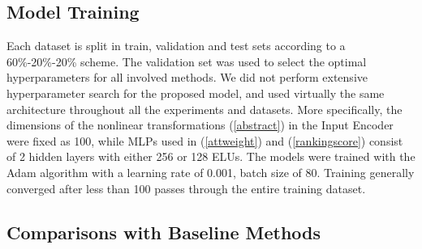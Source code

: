 \documentclass[letterpaper]{article} %
\begin{document}
\subsection{Model Training}

Each dataset is split in train, validation and test sets according to a 60\%-20\%-20\% scheme. The validation set was used to select the optimal hyperparameters for all involved methods. We did not perform extensive hyperparameter search for the proposed model, and used virtually the same architecture throughout all the experiments and datasets. More specifically, the dimensions of the nonlinear transformations (\ref{abstract}) in the Input Encoder were fixed as 100, while MLPs used in (\ref{attweight}) and (\ref{rankingscore}) consist of 2 hidden layers with either 256 or 128 ELUs. The models were trained with the Adam algorithm \cite{kingma2014adam} with a learning rate of 0.001, batch size of 80. Training generally converged after less than 100 passes through the entire training dataset.

\subsection{Comparisons with Baseline Methods}
\end{document}
